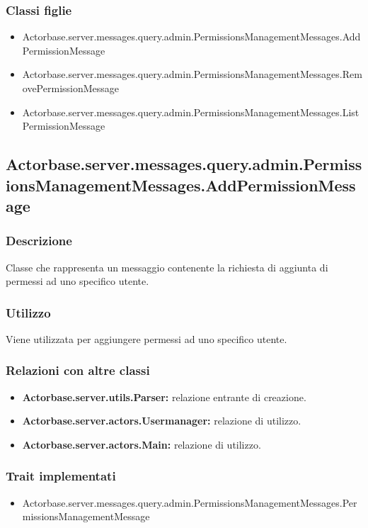 \documentclass[a4paper]{article}
\begin{document}
			\subsubsection{Classi figlie}
				\begin{itemize}
					\item Actorbase.server.messages.query.admin.PermissionsManagementMessages.AddPermissionMessage
					\item Actorbase.server.messages.query.admin.PermissionsManagementMessages.RemovePermissionMessage
					\item Actorbase.server.messages.query.admin.PermissionsManagementMessages.ListPermissionMessage
				\end{itemize}
			
		\subsection{Actorbase.server.messages.query.admin.PermissionsManagementMessages.AddPermissionMessage}
			\subsubsection{Descrizione}
				Classe che rappresenta un messaggio contenente la richiesta di aggiunta di permessi ad uno specifico utente.
				
			\subsubsection{Utilizzo}
				Viene utilizzata per aggiungere permessi ad uno specifico utente.
				
			\subsubsection{Relazioni con altre classi}
				\begin{itemize}
					\item \textbf{Actorbase.server.utils.Parser:} relazione entrante di creazione.
					\item \textbf{Actorbase.server.actors.Usermanager:} relazione di utilizzo.
					\item \textbf{Actorbase.server.actors.Main:} relazione di utilizzo.
				\end{itemize}
			\subsubsection{Trait implementati}
				\begin{itemize}
					\item Actorbase.server.messages.query.admin.PermissionsManagementMessages.PermissionsManagementMessage
				\end{itemize}
		
\end{document}
